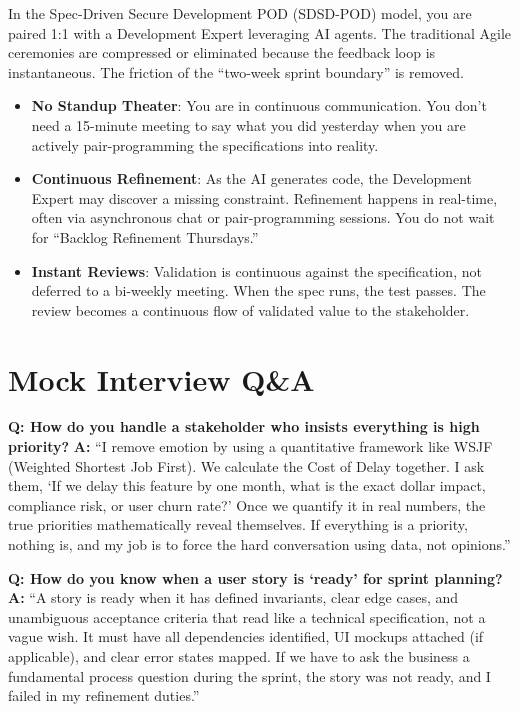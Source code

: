 \documentclass[
  11pt,
  openany,
  oneside]{book}
\providecommand{\tightlist}{%
  \setlength{\itemsep}{0pt}\setlength{\parskip}{0pt}}
\begin{document}
In the Spec-Driven Secure Development POD (SDSD-POD) model, you are
paired 1:1 with a Development Expert leveraging AI agents. The
traditional Agile ceremonies are compressed or eliminated because the
feedback loop is instantaneous. The friction of the ``two-week sprint
boundary'' is removed.

\begin{itemize}
\tightlist
\item
  \textbf{No Standup Theater}: You are in continuous communication. You
  don't need a 15-minute meeting to say what you did yesterday when you
  are actively pair-programming the specifications into reality.
\item
  \textbf{Continuous Refinement}: As the AI generates code, the
  Development Expert may discover a missing constraint. Refinement
  happens in real-time, often via asynchronous chat or pair-programming
  sessions. You do not wait for ``Backlog Refinement Thursdays.''
\item
  \textbf{Instant Reviews}: Validation is continuous against the
  specification, not deferred to a bi-weekly meeting. When the spec
  runs, the test passes. The review becomes a continuous flow of
  validated value to the stakeholder.
\end{itemize}

\section{Mock Interview Q\&A}\label{mock-interview-qa}

\textbf{Q: How do you handle a stakeholder who insists everything is
high priority?} \textbf{A:} ``I remove emotion by using a quantitative
framework like WSJF (Weighted Shortest Job First). We calculate the Cost
of Delay together. I ask them, `If we delay this feature by one month,
what is the exact dollar impact, compliance risk, or user churn rate?'
Once we quantify it in real numbers, the true priorities mathematically
reveal themselves. If everything is a priority, nothing is, and my job
is to force the hard conversation using data, not opinions.''

\textbf{Q: How do you know when a user story is `ready' for sprint
planning?} \textbf{A:} ``A story is ready when it has defined
invariants, clear edge cases, and unambiguous acceptance criteria that
read like a technical specification, not a vague wish. It must have all
dependencies identified, UI mockups attached (if applicable), and clear
error states mapped. If we have to ask the business a fundamental
process question during the sprint, the story was not ready, and I
failed in my refinement duties.''
\end{document}
